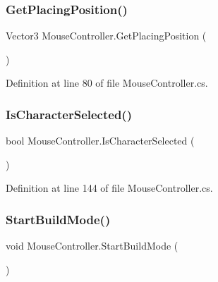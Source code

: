 \mbox{\label{class_mouse_controller_a15de1e155c9b78d28df606af2d6817dd}} 
\subsubsection{\texorpdfstring{Get\+Placing\+Position()}{GetPlacingPosition()}}
{\footnotesize\ttfamily Vector3 Mouse\+Controller.\+Get\+Placing\+Position (\begin{DoxyParamCaption}{ }\end{DoxyParamCaption})}



Definition at line 80 of file Mouse\+Controller.\+cs.

\mbox{\label{class_mouse_controller_a3ef7887060eaa7a7320c5432a395e923}} 
\subsubsection{\texorpdfstring{Is\+Character\+Selected()}{IsCharacterSelected()}}
{\footnotesize\ttfamily bool Mouse\+Controller.\+Is\+Character\+Selected (\begin{DoxyParamCaption}{ }\end{DoxyParamCaption})}



Definition at line 144 of file Mouse\+Controller.\+cs.

\mbox{\label{class_mouse_controller_aa38db8a75d9e6875bbc574588b26ac41}} 
\subsubsection{\texorpdfstring{Start\+Build\+Mode()}{StartBuildMode()}}
{\footnotesize\ttfamily void Mouse\+Controller.\+Start\+Build\+Mode (\begin{DoxyParamCaption}{ }\end{DoxyParamCaption})}



